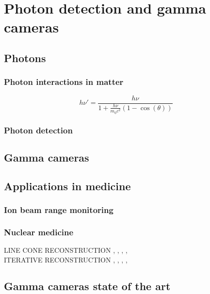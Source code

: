 \chapter{Photon detection and gamma cameras}\label{chap::2}

\vfill

\minitoc

\newpage

\glsresetall

\section{Photons}

\subsection{Photon interactions in matter}

\begin{equation}
h\nu' = \frac{h\nu}{1+\frac{h\nu}{m_{0}c^2}(1-\cos(\theta))}
\label{chap2::eq::Compton}
\end{equation} 

\subsection{Photon detection}


\section{Gamma cameras}

\section{Applications in medicine}

\subsection{Ion beam range monitoring}

\subsection{Nuclear medicine}

LINE CONE RECONSTRUCTION \parencite{Cree1994}, \parencite{Basko1998}, \parencite{Parra1999}, \parencite{Hirasawa2003}, \parencite{Maxim2009} \\

ITERATIVE RECONSTRUCTION \parencite{Schone2010}, \parencite{Zoglauer2011}, \parencite{Gillam2011}, \parencite{Lojacono2013}, \parencite{Mackin2012}\\

\section{Gamma cameras state of the art}

\clearpage

